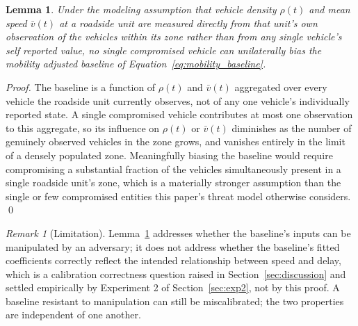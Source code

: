 \documentclass[final,5p,twocolumn]{elsarticle}
\newtheorem{lemma}{Lemma}
\theoremstyle{remark}
\newtheorem{remark}{Remark}
\theoremstyle{plain}
\begin{document}
\begin{lemma}
	\label{lem:baseline_manipulation}
	Under the modeling assumption that vehicle density $\rho(t)$ and mean
	speed $\bar{v}(t)$ at a roadside unit are measured directly from that
	unit's own observation of the vehicles within its zone rather than
	from any single vehicle's self reported value, no single compromised
	vehicle can unilaterally bias the mobility adjusted baseline of
	Equation~\eqref{eq:mobility_baseline}.
\end{lemma}
\begin{proof}
	The baseline is a function of $\rho(t)$ and $\bar{v}(t)$ aggregated
	over every vehicle the roadside unit currently observes, not of any
	one vehicle's individually reported state. A single compromised
	vehicle contributes at most one observation to this aggregate, so its
	influence on $\rho(t)$ or $\bar{v}(t)$ diminishes as the number of
	genuinely observed vehicles in the zone grows, and vanishes entirely
	in the limit of a densely populated zone. Meaningfully biasing the
	baseline would require compromising a substantial fraction of the
	vehicles simultaneously present in a single roadside unit's zone,
	which is a materially stronger assumption than the single or few
	compromised entities this paper's threat model otherwise considers.
	\qed
\end{proof}

\begin{remark}[Limitation]
	Lemma~\ref{lem:baseline_manipulation} addresses whether the baseline's
	inputs can be manipulated by an adversary; it does not address whether
	the baseline's fitted coefficients correctly reflect the intended
	relationship between speed and delay, which is a calibration
	correctness question raised in Section~\ref{sec:discussion} and
	settled empirically by Experiment 2 of Section~\ref{sec:exp2}, not by
	this proof. A baseline resistant to manipulation can still be
	miscalibrated; the two properties are independent of one another.
\end{remark}
\end{document}
